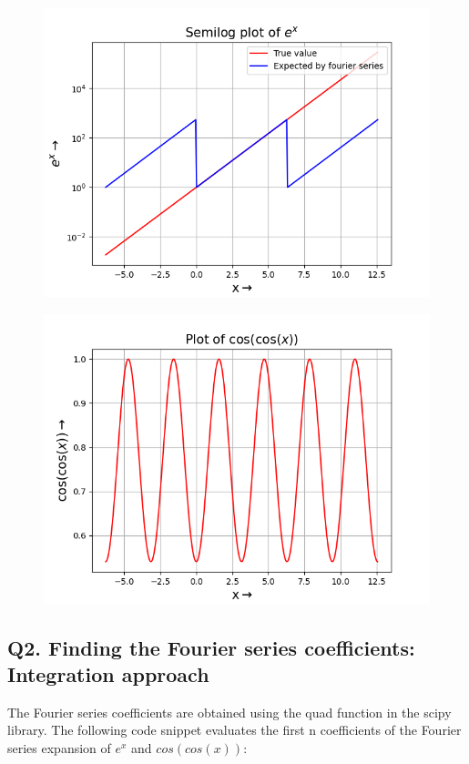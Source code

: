\documentclass{article}
\begin{document}
    \begin{figure}[h!]
    \centering
    \includegraphics[scale=0.5]{q1(a)}
    \label{fig:1(a)}
    \end{figure}
\begin{figure}[h!]
	\centering
	\includegraphics[scale=0.5]{q1(b)}
	\label{fig:1(b)}
\end{figure}






\subsection*{Q2. Finding the Fourier series coefficients: Integration approach}
The Fourier series coefficients are obtained using the quad function in the
scipy library. The following code snippet evaluates the first n coefficients
of the Fourier series expansion of $e^x$ and $cos(cos(x))$:
\end{document}
